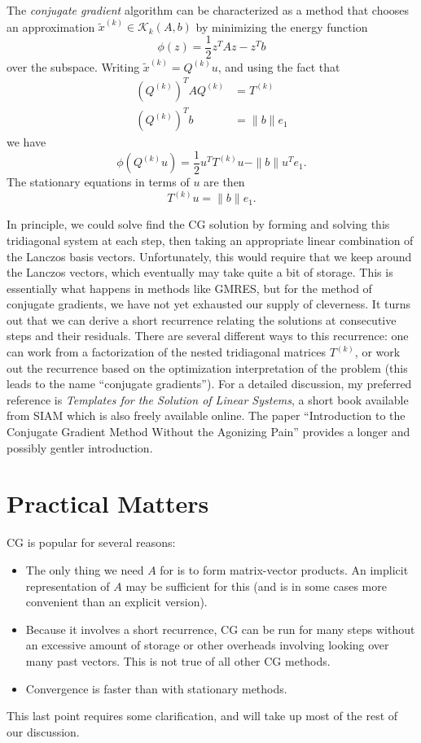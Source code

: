 \documentclass[12pt, leqno]{article}
\newcommand{\calK}{\mathcal{K}}
\begin{document}
The {\em conjugate gradient} algorithm can be characterized as
a method that chooses an approximation
$\tilde{x}^{(k)} \in \calK_k(A,b)$ by minimizing the energy
function
\[
  \phi(z) = \frac{1}{2} z^T A z - z^T b
\]
over the subspace.  Writing $\tilde{x}^{(k)} = Q^{(k)} u$,
and using the fact that
\begin{align*}
  (Q^{(k)})^T A Q^{(k)} & = T^{(k)} \\
  (Q^{(k)})^T b &= \|b\| e_1
\end{align*}
we have
\[
  \phi(Q^{(k)} u) = \frac{1}{2} u^T T^{(k)} u - \|b\| u^T e_1.
\]
The stationary equations in terms of $u$ are then
\[
  T^{(k)} u = \|b\| e_1.
\]

In principle, we could solve find the CG solution by forming and
solving this tridiagonal system at each step, then taking an
appropriate linear combination of the Lanczos basis vectors.
Unfortunately, this would require that we keep around the Lanczos
vectors, which eventually may take quite a bit of storage.
This is essentially what happens in methods like GMRES, but
for the method of conjugate gradients, we have not yet exhausted
our supply of cleverness.  It turns out that we can derive a short
recurrence relating the solutions at consecutive steps and their
residuals.  There are several different ways to this recurrence:
one can work from a factorization of the nested tridiagonal matrices
$T^{(k)}$, or work out the recurrence based on the optimization
interpretation of the problem (this leads to the name ``conjugate
gradients'').  For a detailed discussion, my preferred reference
is {\em Templates for the Solution of Linear Systems},
a short book available from SIAM which is also freely available
online.  The paper ``Introduction to the Conjugate Gradient
Method Without the Agonizing Pain'' provides a longer and possibly
gentler introduction.


\section*{Practical Matters}

CG is popular for several reasons:
\begin{itemize}
\item
  The only thing we need $A$ for is to form matrix-vector products.
  An implicit representation of $A$ may be sufficient for this
  (and is in some cases more convenient than an explicit version).
\item
  Because it involves a short recurrence, CG can be run for many steps
  without an excessive amount of storage or other overheads involving
  looking over many past vectors.  This is not true of all other CG
  methods.
\item
  Convergence is faster than with stationary methods.
\end{itemize}
This last point requires some clarification, and will take up most of
the rest of our discussion.
\end{document}

